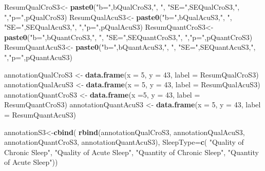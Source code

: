\documentclass[
]{book}
\newenvironment{Shaded}{\begin{snugshade}}{\end{snugshade}}
\newcommand{\DataTypeTok}[1]{\textcolor[rgb]{0.13,0.29,0.53}{#1}}
\newcommand{\DecValTok}[1]{\textcolor[rgb]{0.00,0.00,0.81}{#1}}
\newcommand{\KeywordTok}[1]{\textcolor[rgb]{0.13,0.29,0.53}{\textbf{#1}}}
\newcommand{\NormalTok}[1]{#1}
\newcommand{\StringTok}[1]{\textcolor[rgb]{0.31,0.60,0.02}{#1}}
\begin{document}
\begin{Shaded}
\begin{Highlighting}[]
\NormalTok{ResumQualCroS3<-}\StringTok{ }\KeywordTok{paste0}\NormalTok{(}\StringTok{"b="}\NormalTok{,bQualCroS3,}\StringTok{", "}\NormalTok{, }\StringTok{"SE="}\NormalTok{,SEQualCroS3,}\StringTok{", "}\NormalTok{,}\StringTok{"p="}\NormalTok{,pQualCroS3)}
\NormalTok{ResumQualAcuS3<-}\StringTok{ }\KeywordTok{paste0}\NormalTok{(}\StringTok{"b="}\NormalTok{,bQualAcuS3,}\StringTok{", "}\NormalTok{, }\StringTok{"SE="}\NormalTok{,SEQualAcuS3,}\StringTok{", "}\NormalTok{,}\StringTok{"p="}\NormalTok{,pQualAcuS3)}
\NormalTok{ResumQuantCroS3<-}\StringTok{ }\KeywordTok{paste0}\NormalTok{(}\StringTok{"b="}\NormalTok{,bQuantCroS3,}\StringTok{", "}\NormalTok{, }\StringTok{"SE="}\NormalTok{,SEQuantCroS3,}\StringTok{", "}\NormalTok{,}\StringTok{"p="}\NormalTok{,pQuantCroS3)}
\NormalTok{ResumQuantAcuS3<-}\StringTok{ }\KeywordTok{paste0}\NormalTok{(}\StringTok{"b="}\NormalTok{,bQuantAcuS3,}\StringTok{", "}\NormalTok{, }\StringTok{"SE="}\NormalTok{,SEQuantAcuS3,}\StringTok{", "}\NormalTok{,}\StringTok{"p="}\NormalTok{,pQuantAcuS3)}

\NormalTok{annotationQualCroS3 <-}\StringTok{ }\KeywordTok{data.frame}\NormalTok{(}\DataTypeTok{x =} \DecValTok{5}\NormalTok{, }\DataTypeTok{y =} \DecValTok{43}\NormalTok{,  }\DataTypeTok{label =}\NormalTok{ ResumQualCroS3)}
\NormalTok{annotationQualAcuS3 <-}\StringTok{ }\KeywordTok{data.frame}\NormalTok{(}\DataTypeTok{x =} \DecValTok{5}\NormalTok{, }\DataTypeTok{y =} \DecValTok{43}\NormalTok{,  }\DataTypeTok{label =}\NormalTok{ ResumQualAcuS3)}
\NormalTok{annotationQuantCroS3 <-}\StringTok{ }\KeywordTok{data.frame}\NormalTok{(}\DataTypeTok{x =}\DecValTok{5}\NormalTok{, }\DataTypeTok{y =} \DecValTok{43}\NormalTok{,  }\DataTypeTok{label =}\NormalTok{ ResumQuantCroS3)}
\NormalTok{annotationQuantAcuS3 <-}\StringTok{ }\KeywordTok{data.frame}\NormalTok{(}\DataTypeTok{x =} \DecValTok{5}\NormalTok{, }\DataTypeTok{y =} \DecValTok{43}\NormalTok{,  }\DataTypeTok{label =}\NormalTok{ ResumQuantAcuS3)}

\NormalTok{annotationS3<-}\KeywordTok{cbind}\NormalTok{(}
  \KeywordTok{rbind}\NormalTok{(annotationQualCroS3, }
\NormalTok{        annotationQualAcuS3, }
\NormalTok{        annotationQuantCroS3, }
\NormalTok{        annotationQuantAcuS3),}
  \DataTypeTok{SleepType=}\KeywordTok{c}\NormalTok{(}
        \StringTok{"Quality of Chronic Sleep"}\NormalTok{, }
        \StringTok{"Quality of Acute Sleep"}\NormalTok{, }
        \StringTok{"Quantity of Chronic Sleep"}\NormalTok{, }
        \StringTok{"Quantity of Acute Sleep"}\NormalTok{))}
\end{Highlighting}
\end{Shaded}
\end{document}
